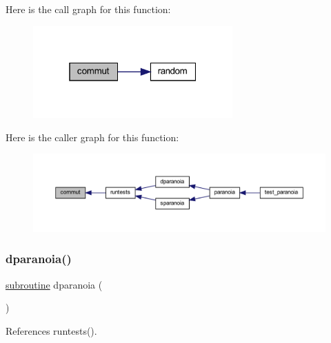 Here is the call graph for this function\+:
\nopagebreak
\begin{figure}[H]
\begin{center}
\leavevmode
\includegraphics[width=217pt]{dparanoia_8f90_ae7890d0a663dc609947497ee29d7b921_cgraph}
\end{center}
\end{figure}
Here is the caller graph for this function\+:
\nopagebreak
\begin{figure}[H]
\begin{center}
\leavevmode
\includegraphics[width=350pt]{dparanoia_8f90_ae7890d0a663dc609947497ee29d7b921_icgraph}
\end{center}
\end{figure}
\mbox{\label{dparanoia_8f90_aea61249b658024bcb8b5812d70a64b93}} 
\subsubsection{\texorpdfstring{dparanoia()}{dparanoia()}}
{\footnotesize\ttfamily \hyperlink{M__stopwatch_83_8txt_acfbcff50169d691ff02d4a123ed70482}{subroutine} dparanoia (\begin{DoxyParamCaption}{ }\end{DoxyParamCaption})}



References runtests().

